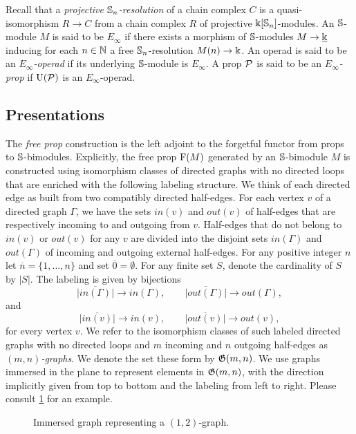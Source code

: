 Recall that a \textit{projective $\mathbb{S}_n$-resolution} of a chain complex $C$ is a quasi-isomorphism $R \to C$ from a chain complex $R$ of projective $\Bbbk[\mathbb{S}_n]$-modules.
An $\mathbb{S}$-module $M$ is said to be $E_\infty$ if there exists a morphism of $\mathbb{S}$-modules $M \to \underline{\Bbbk}$ inducing for each $n \in \mathbb{N}$ a free $\mathbb{S}_n$-resolution $M(n) \to \Bbbk$.
An operad is said to be an \textit{$E_\infty$-operad} if its underlying $\mathbb{S}$-module is $E_\infty$.
A prop $\mathcal{P}$ is said to be an \textit{$E_\infty$-prop} if $\operatorname{U}(\mathcal{P})$ is an $E_\infty$-operad.

\subsection{Presentations} \label{ss:presentation}

The \textit{free prop} construction is the left adjoint to the forgetful functor from props to $\mathbb{S}$-bimodules.
Explicitly, the free prop $\operatorname{F}(M)$ generated by an $\mathbb{S}$-bimodule $M$ is constructed using isomorphism classes of directed graphs with no directed loops that are enriched with the following labeling structure.
We think of each directed edge as built from two compatibly directed half-edges.
For each vertex $v$ of a directed graph $\Gamma$, we have the sets $in(v)$ and $out(v)$ of half-edges that are respectively incoming to and outgoing from $v$.
Half-edges that do not belong to $in(v)$ or $out(v)$ for any $v$ are divided into the disjoint sets $in(\Gamma)$ and $out(\Gamma)$ of incoming and outgoing external half-edges.
For any positive integer $n$ let $\overline{n} = \{1, \dots, n\}$ and set $\overline{0} = \emptyset$.
For any finite set $S$, denote the cardinality of $S$ by $|S|$.
The labeling is given by bijections
\[
\overline{|in(\Gamma)|} \to in(\Gamma), \qquad
\overline{|out(\Gamma)|} \to out(\Gamma),
\]
and
\[
\overline{|in(v)|} \to in(v), \qquad
\overline{|out(v)|} \to out(v),
\]
for every vertex $v$.
We refer to the isomorphism classes of such labeled directed graphs with no directed loops and $m$ incoming and $n$ outgoing half-edges as $(m,n)$\textit{-graphs}.
We denote the set these form by $\mathfrak{G}(m,n)$.
We use graphs immersed in the plane to represent elements in $\mathfrak{G}(m,n)$, with the direction implicitly given from top to bottom and the labeling from left to right.
Please consult \cref{f:immersion} for an example.

\begin{figure}[h]
	\centering
	
	\caption{Immersed graph representing a $(1,2)$-graph.}
	\label{f:immersion}
\end{figure}

